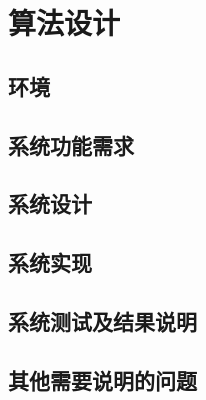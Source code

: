 
\section{算法设计}
\subsection{环境}


\subsection{系统功能需求}


\subsection{系统设计}


\subsection{系统实现}


\subsection{系统测试及结果说明}


\subsection{其他需要说明的问题}